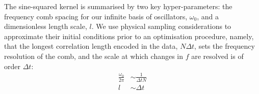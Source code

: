 The sine-squared kernel is summarised by two key hyper-parameters: the frequency comb spacing for our infinite basis of oscillators, $\omega_0$, and a dimensionless length scale, $l$. We use physical sampling considerations to approximate their initial conditions prior to an optimisation procedure, namely, that the longest correlation length encoded in the data, $N \Delta t $, sets the frequency resolution of the comb, and the scale at which changes in $f$ are resolved is of order  $\Delta t$:
\begin{align}
\frac{\omega_0}{2\pi} & \sim  \frac{1}{\Delta t N} \\
l & \sim \Delta t
\end{align} 
